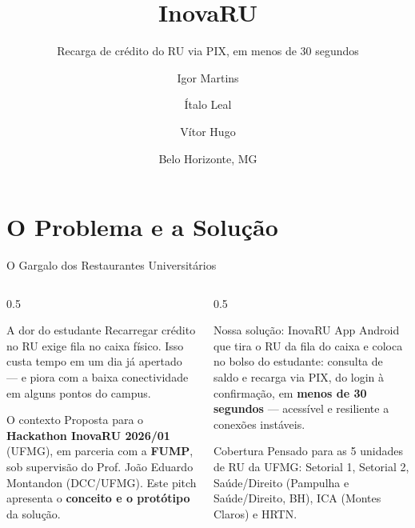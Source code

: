 \documentclass[10pt, aspectratio=169]{beamer}
\title{InovaRU}
\subtitle{Recarga de crédito do RU via PIX, em menos de 30 segundos}
\author{Igor Martins \and Ítalo Leal \and Vítor Hugo}
\institute{Universidade Federal de Minas Gerais (UFMG) \\ Hackathon InovaRU 2026/01 --- FUMP}
\date{Belo Horizonte, MG}
\begin{document}
\begin{frame}
    \maketitle
\end{frame}

\section{O Problema e a Solução}

\begin{frame}{O Gargalo dos Restaurantes Universitários}
    \begin{columns}[T]
        \begin{column}{0.5\textwidth}
            \begin{block}{A dor do estudante}
                \small
                Recarregar crédito no RU exige fila no caixa físico. Isso custa tempo em um dia já apertado --- e piora com a baixa conectividade em alguns pontos do campus.
            \end{block}
            \vspace{0.3cm}
            \begin{block}{O contexto}
                \small
                Proposta para o \textbf{Hackathon InovaRU 2026/01} (UFMG), em parceria com a \textbf{FUMP}, sob supervisão do Prof. João Eduardo Montandon (DCC/UFMG). Este pitch apresenta o \textbf{conceito e o protótipo} da solução.
            \end{block}
        \end{column}
        \begin{column}{0.5\textwidth}
            \begin{alertblock}{Nossa solução: InovaRU}
                \small
                App Android que tira o RU da fila do caixa e coloca no bolso do estudante: consulta de saldo e recarga via PIX, do login à confirmação, em \textbf{menos de 30 segundos} --- acessível e resiliente a conexões instáveis.
            \end{alertblock}
            \vspace{0.3cm}
            \begin{block}{Cobertura}
                \small
                Pensado para as 5 unidades de RU da UFMG: Setorial 1, Setorial 2, Saúde/Direito (Pampulha e Saúde/Direito, BH), ICA (Montes Claros) e HRTN.
            \end{block}
        \end{column}
    \end{columns}
\end{frame}
\end{document}
